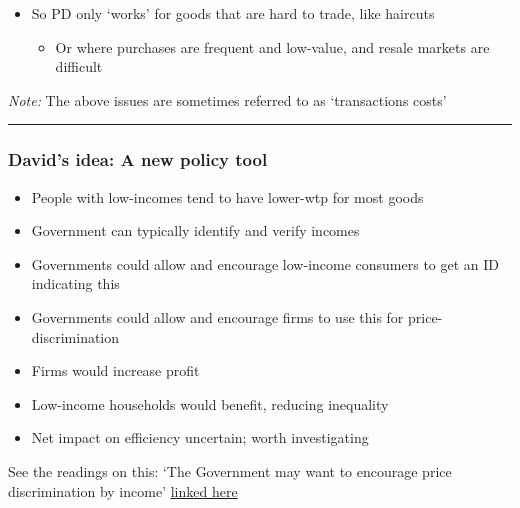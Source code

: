 \documentclass[]{article}
\providecommand{\tightlist}{%
  \setlength{\itemsep}{0pt}\setlength{\parskip}{0pt}}
\begin{document}
\bigskip

\begin{itemize}
\tightlist
\item
  So PD only `works' for goods that are hard to trade, like haircuts

  \begin{itemize}
  \tightlist
  \item
    Or where purchases are frequent and low-value, and resale markets are difficult
  \end{itemize}
\end{itemize}

\emph{Note:}
The above issues are sometimes referred to as `transactions costs'

\begin{center}\rule{0.5\linewidth}{\linethickness}\end{center}

\hypertarget{davids-idea-a-new-policy-tool}{%
\subsubsection{David's idea: A new policy tool}\label{davids-idea-a-new-policy-tool}}

\begin{itemize}
\tightlist
\item
  People with low-incomes tend to have lower-wtp for most goods
\item
  Government can typically identify and verify incomes
\item
  Governments could allow and encourage low-income consumers to get an ID indicating this
\item
  Governments could allow and encourage firms to use this for price-discrimination
\end{itemize}

\bigskip

\begin{itemize}
\tightlist
\item
  Firms would increase profit
\item
  Low-income households would benefit, reducing inequality
\item
  Net impact on efficiency uncertain; worth investigating
\end{itemize}

See the readings on this: `The Government may want to encourage price discrimination by income' \href{https://davidreinstein.wordpress.com/research-and-publications/}{linked here}
\end{document}

